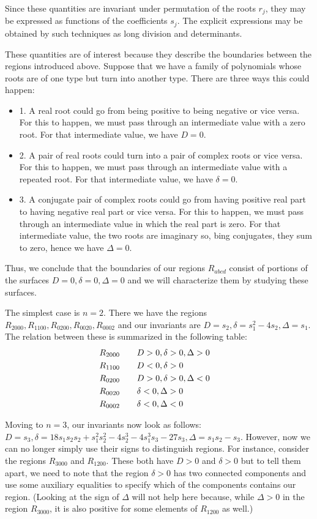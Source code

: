 \documentclass{amsart}
\theoremstyle{definition}
\theoremstyle{remark}
\numberwithin{equation}{section}
\begin{document}
Since these quantities are invariant under permutation of the roots
$r_j$, they may be expressed as functions of the coefficients $s_j$.
The explicit expressions may be obtained by such techniques as long
division and determinants.

These quantities are of interest because they describe the boundaries
between the regions introduced above.  Suppose that we have a family
of polynomials whose roots are of one type but turn into another type.
There are three ways this could happen:
\begin{itemize}
\item{1.} A real root could go from being positive to being negative
  or vice versa.  For this to happen, we must pass through an
  intermediate value with a zero root.  For that intermediate value,
  we have $D = 0$.
\item{2.} A pair of real roots could turn into a pair of complex roots
  or vice versa.  For this to happen, we must pass through an
  intermediate value with a repeated root.  For that intermediate
  value, we have $\delta = 0$.
\item{3.} A conjugate pair of complex roots could go from having
  positive real part to having negative real part or vice versa.  For
  this to happen, we must pass through an intermediate value in which
  the real part is zero.  For that intermediate value, the two roots
  are imaginary so, bing conjugates, they sum to zero, hence we have
  $\Delta = 0$.
\end{itemize}
\noindent  Thus, we conclude that the boundaries of our regions
$R_{abcd}$ consist of portions of the surfaces $D=0, \delta=0,
\Delta=0$ and we will characterize them by studying these surfaces.

The simplest case is $n=2$.  There we have the regions $R_{2000},
R_{1100}, R_{0200}, R_{0020}, R_{0002}$ and our invariants are $D =
s_2, \delta = s_1^2 - 4s_2, \Delta = s_1$.  The relation between these
is summarized in the following table:
\begin{align}
R_{2000} \qquad &D > 0, \delta > 0, \Delta > 0 \cr
R_{1100} \qquad &D < 0, \delta > 0 \cr
R_{0200} \qquad &D > 0, \delta > 0, \Delta < 0 \cr
R_{0020} \qquad &\delta < 0, \Delta > 0 \cr
R_{0002} \qquad &\delta < 0, \Delta < 0 \cr
\end{align}

Moving to $n=3$, our invariants now look as follows: $D = s_3, \delta
= 18 s_1 s_2 s_2 + s_1^2 s_2^2 - 4 s_2^3 - 4 s_1^3 s_3 - 27 s_3,
\Delta = s_1 s_2 - s_3$.  However, now we can no longer simply use their
signs to distinguish regions.  For instance, consider the regions
$R_{3000}$ and $R_{1200}$.  These both have $D > 0$ and $\delta > 0$
but to tell them apart, we need to note that the region $\delta > 0$
has two connected components and use some auxiliary equalities to
specify which of the components contains our region.  (Looking at the
sign of $\Delta$ will not help here because, while $\Delta > 0$ in the
region $R_{3000}$, it is also positive for some elements of $R_{1200}$
as well.)
\end{document}
